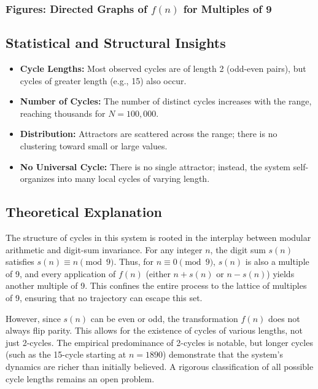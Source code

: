 \documentclass[12pt]{article}
\begin{document}
\subsubsection{Figures: Directed Graphs of $f(n)$ for Multiples of 9}


\subsection{Statistical and Structural Insights}
\begin{itemize}
    \item \textbf{Cycle Lengths:} Most observed cycles are of length 2 (odd-even pairs), but cycles of greater length (e.g., 15) also occur.
    \item \textbf{Number of Cycles:} The number of distinct cycles increases with the range, reaching thousands for $N=100,000$.
    \item \textbf{Distribution:} Attractors are scattered across the range; there is no clustering toward small or large values.
    \item \textbf{No Universal Cycle:} There is no single attractor; instead, the system self-organizes into many local cycles of varying length.
\end{itemize}

\subsection{Theoretical Explanation}
The structure of cycles in this system is rooted in the interplay between modular arithmetic and digit-sum invariance. For any integer $n$, the digit sum $s(n)$ satisfies $s(n) \equiv n \pmod{9}$. Thus, for $n \equiv 0 \pmod{9}$, $s(n)$ is also a multiple of 9, and every application of $f(n)$ (either $n + s(n)$ or $n - s(n)$) yields another multiple of 9. This confines the entire process to the lattice of multiples of 9, ensuring that no trajectory can escape this set.

However, since $s(n)$ can be even or odd, the transformation $f(n)$ does not always flip parity. This allows for the existence of cycles of various lengths, not just 2-cycles. The empirical predominance of 2-cycles is notable, but longer cycles (such as the 15-cycle starting at $n=1890$) demonstrate that the system's dynamics are richer than initially believed. A rigorous classification of all possible cycle lengths remains an open problem.
\end{document}
